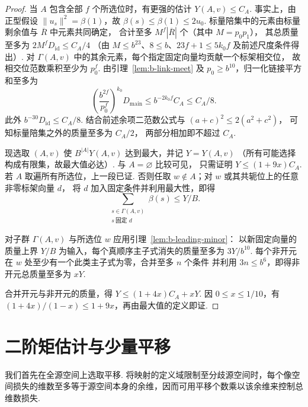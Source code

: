 \begin{proof}
当 $A$ 包含全部 $f$ 个所选位时，有更强的估计 $Y(A,v)\le C_A$.
事实上，由正型假设 $\|u_s\|^2=\beta(1)$，故 $\beta(s)\le\beta(1)\le2u_0$.
标量陪集中的元素由标量剩余值与 $\overline R$ 中元素共同确定，
合计至多 $M^f|\overline R|$ 个（其中 $M=p_0p_1$），
其总质量至多为 $2M^f D_{\mathrm{id}}\le C_A/4$
（由 $M\le b^{23}$、$8\le b$、$23f+1\le5k_0f$ 及前述尺度条件得出）.
对 $\Gamma(A,v)$ 中的其余元素，每个指定固定向量均贡献一个标架相交位，
故相交位范数乘积至少为 $p_0^f$.
由引理~\ref{lem:b-link-meet} 及 $p_0\ge b^{10}$，归一化链接平方和至多为
\[
 \left(\frac{b^{2f}}{p_0^f}\right)^{k_0}D_{\mathrm{main}}
 \le b^{-2k_0f}C_A\le C_A/8.
\]
此外 $b^{-30}D_{\mathrm{id}}\le C_A/8$.
结合前述余项二范数公式与 $(a+c)^2\le2(a^2+c^2)$，
可知标量陪集之外的质量至多为 $C_A/2$，
两部分相加即不超过 $C_A$.

现选取 $(A,v)$ 使 $B^{|A|}Y(A,v)$ 达到最大，并记 $Y=Y(A,v)$
（所有可能选择构成有限集，故最大值必达）. 与 $A=\varnothing$ 比较可见，
只需证明 $Y\le(1+9x)C_A$. 若 $A$ 取遍所有所选位，上一段已证.
否则任取 $w\notin A$；对 $w$ 或其共轭位上的任意非零标架向量 $d$，
将 $d$ 加入固定条件并利用最大性，即得
\[
 \sum_{\substack{s\in\Gamma(A,v)\\s\ \text{固定 }d}}\beta(s)\le Y/B.
\]

对子群 $\Gamma(A,v)$ 与所选位 $w$ 应用引理~\ref{lem:b-leading-minor}：
以新固定向量的质量上界 $Y/B$ 为输入，每个真顺序主子式消失的质量至多为 $3Y/b^{10}$.
每个非开元在 $w$ 处至少有一个此类主子式为零，合并至多 $n$ 个条件
并利用 $3n\le b^6$，即得非开元总质量至多为 $xY$.

合并开元与非开元的质量，得 $Y\le(1+4x)C_A+xY$.
因 $0\le x\le1/10$，有
$(1+4x)/(1-x)\le1+9x$，再由最大值的定义即证.
\end{proof}

\section{二阶矩估计与少量平移}
\label{sec:b-translate}

我们首先在全源空间上选取平移. 将映射的定义域限制至分歧源空间时，每个像空间损失的维数至多等于源空间本身的余维，因而可用平移个数乘以该余维来控制总维数损失.

